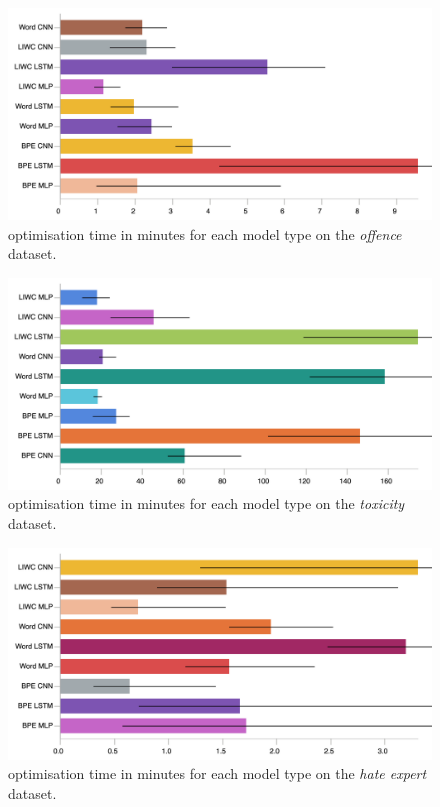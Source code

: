 \begin{figure}[h]
    \centering
    \includegraphics[width=\textwidth]{davidson_train_time.pdf}
    \caption{optimisation time in minutes for each model type on the \textit{offence} dataset.}
    \label{fig:davidson_train_time}
\end{figure}
\begin{figure}[h]
    \centering
    \includegraphics[width=\textwidth]{wulczyn_train_time.pdf}
    \caption{optimisation time in minutes for each model type on the \textit{toxicity} dataset.}
    \label{fig:wulczyn_train_time}
\end{figure}
\begin{figure}[h]
    \centering
    \includegraphics[width=\textwidth]{waseem_train_time.pdf}
    \caption{optimisation time in minutes for each model type on the \textit{hate expert} dataset.}
    \label{fig:waseem_train_time}
\end{figure}
